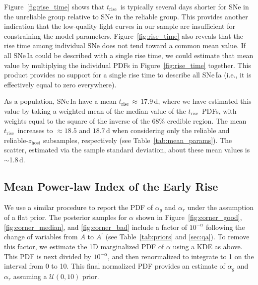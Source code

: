 \documentclass[twocolumn]{./aastex63}
\newcommand{\trise}{$t_\mathrm{rise}$}
\begin{document}
Figure~\ref{fig:rise_time} shows that \trise\ is typically several days
shorter for SNe in the unreliable group relative to SNe in the reliable group.
This provides another indication that the low-quality light curves in our
sample are insufficient for constraining the model parameters.
Figure~\ref{fig:rise_time} also reveals that the rise time among individual
SNe does not tend toward a common mean value. If all SNe\,Ia could be
described with a single rise time, we could estimate that mean value by
multiplying the individual PDFs in Figure~\ref{fig:rise_time}
together. This product provides no support for a single rise time to describe
all SNe\,Ia (i.e., it is effectively equal to zero everywhere).

As a population, SNe\,Ia have a mean \trise\,$\approx\,17.9$\,d, where
we have estimated this value by taking a weighted mean of the median value of
the \trise\ PDFs, with weights equal to the square of the inverse of the 68\%
credible region. The mean \trise\ increases to $\approx 18.5$ and
$18.7$\,d when considering only the reliable and reliable-$z_\mathrm{host}$
subsamples, respectively (see Table~\ref{tab:mean_params}). The scatter,
estimated via the sample standard deviation, about these mean values is
$\sim$1.8\,d.



\subsection{Mean Power-law Index of the Early Rise}

We use a similar procedure to report the PDF of $\alpha_g$ and $\alpha_r$
under the assumption of a flat prior. The posterior samples for $\alpha$ shown
in Figure~\ref{fig:corner_good}, \ref{fig:corner_median}, and
\ref{fig:corner_bad} include a factor of $10^{-\alpha}$ following the
change of variables from $A$ to $A^\prime$ (see Table~\ref{tab:priors} and
\ref{sec:qa}). To remove this factor, we estimate the 1D marginalized PDF of
$\alpha$ using a KDE as above. This PDF is next divided by $10^{-\alpha}$, and
then renormalized to integrate to 1 on the interval from 0 to 10. This final
normalized PDF provides an estimate of $\alpha_g$ and $\alpha_r$ assuming a
$\mathcal{U}(0,10)$ prior.
\end{document}
